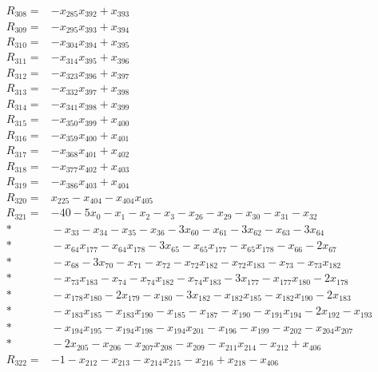 \begin{align*}
R_{308}={}&-x_{285}x_{392}+x_{393}\\[3pt]
R_{309}={}&-x_{295}x_{393}+x_{394}\\[3pt]
R_{310}={}&-x_{304}x_{394}+x_{395}\\[3pt]
R_{311}={}&-x_{314}x_{395}+x_{396}\\[3pt]
R_{312}={}&-x_{323}x_{396}+x_{397}\\[3pt]
R_{313}={}&-x_{332}x_{397}+x_{398}\\[3pt]
R_{314}={}&-x_{341}x_{398}+x_{399}\\[3pt]
R_{315}={}&-x_{350}x_{399}+x_{400}\\[3pt]
R_{316}={}&-x_{359}x_{400}+x_{401}\\[3pt]
R_{317}={}&-x_{368}x_{401}+x_{402}\\[3pt]
R_{318}={}&-x_{377}x_{402}+x_{403}\\[3pt]
R_{319}={}&-x_{386}x_{403}+x_{404}\\[3pt]
R_{320}={}&x_{225}-x_{404}-x_{404}x_{405}\\[3pt]
R_{321}={}&-40-5x_{0}-x_{1}-x_{2}-x_{3}-x_{26}-x_{29}-x_{30}-x_{31}-x_{32}\\*
&{}-x_{33}-x_{34}-x_{35}-x_{36}-3x_{60}-x_{61}-3x_{62}-x_{63}-3x_{64}\\*
&{}-x_{64}x_{177}-x_{64}x_{178}-3x_{65}-x_{65}x_{177}-x_{65}x_{178}-x_{66}-2x_{67}\\*
&{}-x_{68}-3x_{70}-x_{71}-x_{72}-x_{72}x_{182}-x_{72}x_{183}-x_{73}-x_{73}x_{182}\\*
&{}-x_{73}x_{183}-x_{74}-x_{74}x_{182}-x_{74}x_{183}-3x_{177}-x_{177}x_{180}-2x_{178}\\*
&{}-x_{178}x_{180}-2x_{179}-x_{180}-3x_{182}-x_{182}x_{185}-x_{182}x_{190}-2x_{183}\\*
&{}-x_{183}x_{185}-x_{183}x_{190}-x_{185}-x_{187}-x_{190}-x_{191}x_{194}-2x_{192}-x_{193}\\*
&{}-x_{194}x_{195}-x_{194}x_{198}-x_{194}x_{201}-x_{196}-x_{199}-x_{202}-x_{204}x_{207}\\*
&{}-2x_{205}-x_{206}-x_{207}x_{208}-x_{209}-x_{211}x_{214}-x_{212}+x_{406}\\[3pt]
R_{322}={}&-1-x_{212}-x_{213}-x_{214}x_{215}-x_{216}+x_{218}-x_{406}\\[3pt]
\end{align*}
\endgroup
